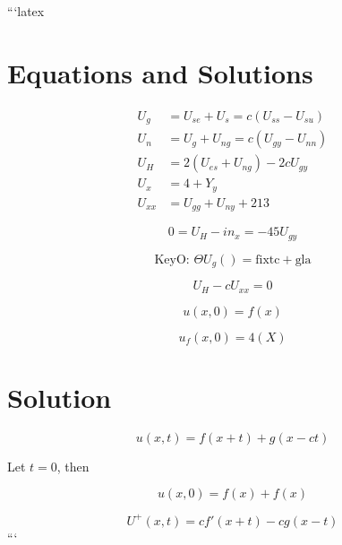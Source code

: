 ```latex
\section*{Equations and Solutions}

\begin{align}
    U_g &= U_{se} + U_s = c(U_{ss} - U_{su}) \\
    U_n &= U_g + U_{ng} = c(U_{gy} - U_{nn}) \\
    U_H &= 2(U_{es} + U_{ng}) - 2cU_{gy} \\
    U_x &= 4 + Y_y \\
    U_{xx} &= U_{gg} + U_{ny} + 213
\end{align}

\begin{equation}
    0 = U_H - in_x = -45U_{gy}
\end{equation}

\begin{equation}
    \text{KeyO: } \Theta U_g() = \text{fixtc} + \text{gla}
\end{equation}

\begin{equation}
    U_H - cU_{xx} = 0
\end{equation}

\begin{equation}
    u(x, 0) = f(x)
\end{equation}

\begin{equation}
    u_f(x, 0) = 4(X)
\end{equation}

\section*{Solution}

\begin{equation}
    u(x, t) = f(x + t) + g(x - ct)
\end{equation}

Let \( t = 0 \), then

\begin{equation}
    u(x, 0) = f(x) + f(x)
\end{equation}

\begin{equation}
    U^+(x, t) = cf'(x + t) - cg(x - t)
\end{equation}
```

